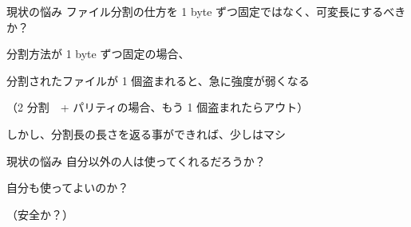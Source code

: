 \begin{frame}{現状の悩み}{}
  ファイル分割の仕方を 1 byte ずつ固定ではなく、可変長にするべきか？
  \vspace{1cm}

  分割方法が 1 byte ずつ固定の場合、

  分割されたファイルが 1 個盗まれると、急に強度が弱くなる

  （2 分割　+ パリティの場合、もう 1 個盗まれたらアウト）
  \vspace{1cm}

  しかし、分割長の長さを返る事ができれば、少しはマシ
\end{frame}

\begin{frame}{現状の悩み}{}
  自分以外の人は使ってくれるだろうか？
  \vspace{1cm}

  自分も使ってよいのか？

  （安全か？）
\end{frame}



